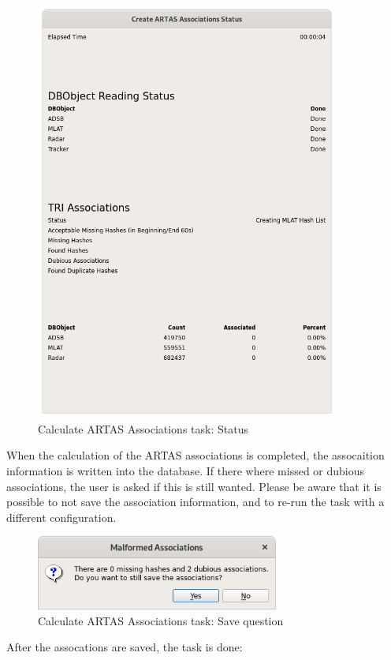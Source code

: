 \begin{figure}[H]
  \center
    \includegraphics[width=10cm]{../screenshots/artas_assoc_status.png}
  \caption{Calculate ARTAS Associations task: Status}
\end{figure}

When the calculation of the ARTAS associations is completed, the assocaition information is written into the database. If there where missed or dubious associations, the user is asked if this is still wanted. Please be aware that it is possible to not save the association information, and to re-run the task with a different configuration.

\begin{figure}[H]
  \center
    \includegraphics[width=8cm]{../screenshots/artas_assoc_question.png}
  \caption{Calculate ARTAS Associations task: Save question}
\end{figure}

After the assocations are saved, the task is done:

